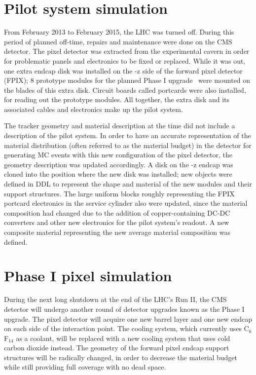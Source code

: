 \section{Pilot system simulation\label{sec:matbudg-pilot}}

From February 2013 to February 2015, the LHC was turned off. During this period of planned off-time, repairs and maintenance were done on the CMS detector. The pixel detector was extracted from the experimental cavern in order for problematic panels and electronics to be fixed or replaced. While it was out, one extra endcap disk was installed on the -z side of the forward pixel detector (FPIX); 8 prototype modules for the planned Phase I upgrade~\cite{Dominguez:1481838} were mounted on the blades of this extra disk. Circuit boards called portcards were also installed, for reading out the prototype modules. All together, the extra disk and its associated cables and electronics make up the pilot system.

The tracker geometry and material description at the time did not include a description of the pilot system. In order to have an accurate representation of the material distribution (often referred to as the material budget) in the detector for generating MC events with this new configuration of the pixel detector, the geometry description was updated accordingly. A disk on the -z endcap was cloned into the position where the new disk was installed; new objects were defined in DDL to represent the shape and material of the new modules and their support structures. The large uniform blocks roughly representing the FPIX portcard electronics in the service cylinder also were updated, since the material composition had changed due to the addition of copper-containing DC-DC converters and other new electronics for the pilot system's readout. A new composite material representing the new average material composition was defined.

\section{Phase I pixel simulation\label{sec:matbudg-phase1}}

During the next long shutdown at the end of the LHC's Run II, the CMS detector will undergo another round of detector upgrades known as the Phase I upgrade. The pixel detector will acquire one new barrel layer and one new endcap on each side of the interaction point. The cooling system, which currently uses C$_{6}$F$_{14}$ as a coolant, will be replaced with a new cooling system that uses cold carbon dioxide instead. The geometry of the forward pixel endcap support structures will be radically changed, in order to decrease the material budget while still providing full coverage with no dead space.

